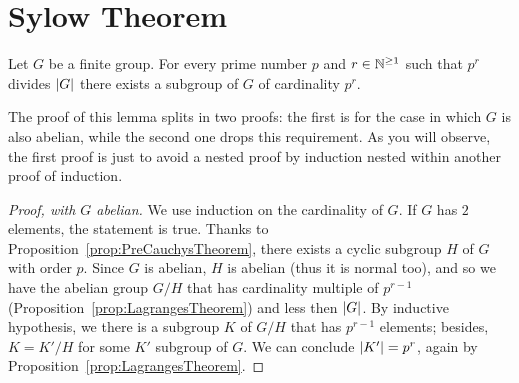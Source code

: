 
\section{Sylow Theorem}

\begin{proposition}\label{prop:SylowTheorem1}
Let \(G\) be a finite group. For every prime number \(p\) and \(r \in \mathbb N^{\ge 1}\) such that \(p^r\) divides \(\left\lvert G\right\rvert\) there exists a subgroup of \(G\) of cardinality \(p^r\).
\end{proposition}

The proof of this lemma splits in two proofs: the first is for the case in which \(G\) is also abelian, while the second one drops this requirement. As you will observe, the first proof is just to avoid a nested proof by induction nested within another proof of induction. 

\begin{proof}[Proof, with \(G\) abelian] We use induction on the cardinality of \(G\). If \(G\) has \(2\) elements, the statement is true. Thanks to Proposition~\ref{prop:PreCauchysTheorem}, there exists a cyclic subgroup \(H\) of \(G\) with order \(p\). Since \(G\) is abelian, \(H\) is abelian (thus it is normal too), and so we have the abelian group \(G/H\) that has cardinality multiple of \(p^{r-1}\) (Proposition~\ref{prop:LagrangesTheorem}) and less then \(\left\lvert G\right\rvert\). By inductive hypothesis, we there is a subgroup \(K\) of \(G/H\) that has \(p^{r-1}\) elements; besides, \(K = K'/H\) for some \(K'\) subgroup of \(G\). We can conclude \(\left\lvert K'\right\rvert = p^{r}\), again by Proposition~\ref{prop:LagrangesTheorem}.
\end{proof}

